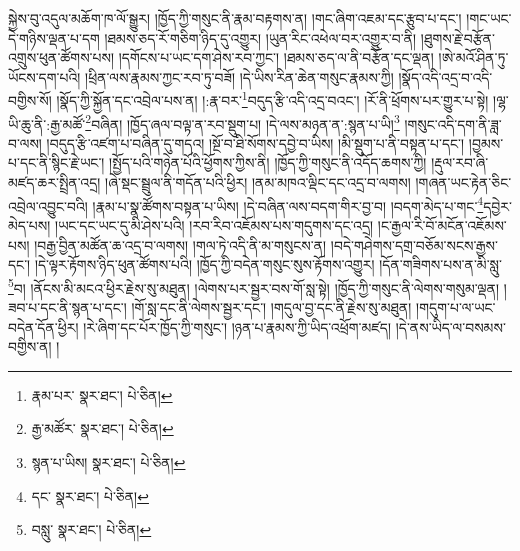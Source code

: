 སྐྱེས་བུ་འདུལ་མཆོག་ཁ་ལོ་སྒྱུར། །ཁྱོད་ཀྱི་གསུང་ནི་རྣམ་བརྟགས་ན། །གང་ཞིག་འཇམ་དང་རྩུབ་པ་དང་། །གང་ཡང་དེ་གཉིས་ལྡན་པ་དག །ཐམས་ཅད་རོ་གཅིག་ཉིད་དུ་འགྱུར། །ཡུན་རིང་འཕེལ་བར་འགྱུར་བ་ནི། །ཐུགས་རྗེ་བརྩོན་འགྲུས་ཕུན་ཚོགས་པས། །དགོངས་པ་ཡང་དག་ཤེས་རབ་ཀྱང་། །ཐམས་ཅད་ལ་ནི་བརྩོན་དང་ལྡན། །ཨེ་མའོ་ཤིན་ཏུ་ཡོངས་དག་པའི། །ཕྲིན་ལས་རྣམས་ཀྱང་རབ་ཏུ་བཟོ། །དེ་ཡིས་རིན་ཆེན་གསུང་རྣམས་ཀྱི། །སྣོད་འདི་འདྲ་བ་འདི་བགྱིས་སོ། །སྣོད་ཀྱི་སྐྱོན་དང་འབྲེལ་པས་ན། །:རྣ་བར་\footnote{རྣམ་པར་  སྣར་ཐང་།  པེ་ཅིན། }བདུད་རྩི་འདི་འདྲ་བའང་། །རོ་ནི་ཕྲོགས་པར་གྱུར་པ་སྟེ། །ལྷ་ཡི་ཆུ་ནི་:རྒྱ་མཚོ་\footnote{རྒྱ་མཚོར་  སྣར་ཐང་།  པེ་ཅིན། }བཞིན། །ཁྱོད་ཞལ་བལྟ་ན་རབ་སྡུག་པ། །དེ་ལས་མཉན་ན་:སྙན་པ་ཡི།\footnote{སྙན་པ་ཡིས།  སྣར་ཐང་།  པེ་ཅིན། } །གསུང་འདི་དག་ནི་ཟླ་བ་ལས། །བདུད་རྩི་འཛག་པ་བཞིན་དུ་གདའ། །སྔོ་བ་ཐི་སོགས་དབྱེ་བ་ཡིས། །མི་སྡུག་པ་ནི་བསྟན་པ་དང་། །བྱམས་པ་དང་ནི་སྙིང་རྗེ་ཡང་། །སྤྱོད་པའི་གཉེན་པོའི་ཕྱོགས་ཀྱིས་ནི། །ཁྱོད་ཀྱི་གསུང་ནི་འདོད་ཆགས་ཀྱི། །རྡུལ་རབ་ཞི་མཛད་ཆར་སྤྲིན་འདྲ། །ཞེ་སྡང་སྦྲུལ་ནི་གདོན་པའི་ཕྱིར། །ནམ་མཁའ་ལྡིང་དང་འདྲ་བ་ལགས། །གཞན་ཡང་རྟེན་ཅིང་འབྲེལ་འབྱུང་བའི། །རྣམ་པ་སྣ་ཚོགས་བསྟན་པ་ཡིས། །དེ་བཞིན་ལས་བདག་གིར་བྱ་བ། །བདག་མེད་པ་གང་\footnote{དང་  སྣར་ཐང་།  པེ་ཅིན། }དབྱེར་མེད་པས། །ཡང་དང་ཡང་དུ་མི་ཤེས་པའི། །རབ་རིབ་འཇོམས་པས་གདུགས་དང་འདྲ། །ང་རྒྱལ་རི་བོ་མངོན་འཇོམས་པས། །བརྒྱ་བྱིན་མཚོན་ཆ་འདྲ་བ་ལགས། །གལ་ཏེ་འདི་ནི་མ་གསུངས་ན། །བདེ་གཤེགས་དགྲ་བཅོམ་སངས་རྒྱས་དང་། །དེ་ལྟར་རྟོགས་ཉིད་ཕུན་ཚོགས་པའི། །ཁྱོད་ཀྱི་བདེན་གསུང་སུས་རྟོགས་འགྱུར། །དོན་གཟིགས་པས་ན་མི་སླུ་\footnote{བསླུ་  སྣར་ཐང་།  པེ་ཅིན། }བ། །ནོངས་མི་མངའ་ཕྱིར་རྗེས་སུ་མཐུན། །ལེགས་པར་སྦྱར་བས་གོ་སླ་སྟེ། །ཁྱོད་ཀྱི་གསུང་ནི་ལེགས་གསུམ་ལྡན། །ཟབ་པ་དང་ནི་སྙན་པ་དང་། །གོ་སླ་དང་ནི་ལེགས་སྦྱར་དང་། །གདུལ་བྱ་དང་ནི་རྗེས་སུ་མཐུན། །གདུག་པ་ལ་ཡང་བདེན་དོན་ཕྱིར། །རེ་ཞིག་དང་པོར་ཁྱོད་ཀྱི་གསུང་། །ཉན་པ་རྣམས་ཀྱི་ཡིད་འཕྲོག་མཛད། །དེ་ནས་ཡིད་ལ་བསམས་བགྱིས་ན། །
